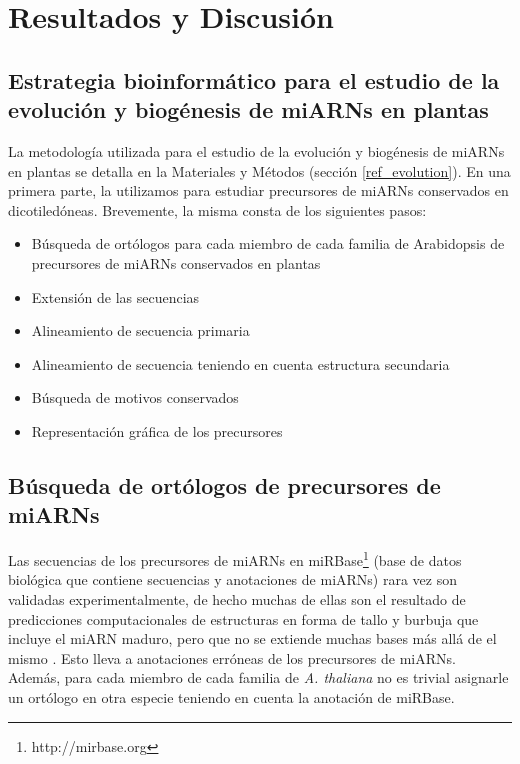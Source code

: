 \section{Resultados y Discusión}

\subsection{Estrategia bioinformático para el estudio de la evolución y biogénesis de miARNs en plantas}

La metodología utilizada para el estudio de la evolución y biogénesis de miARNs en plantas se detalla en la Materiales y Métodos (sección \ref{ref_evolution}).
En una primera parte, la utilizamos para estudiar precursores de miARNs conservados en dicotiledóneas. 
Brevemente, la misma consta de los siguientes pasos:

\begin{itemize}
    \item Búsqueda de ortólogos para cada miembro de cada familia de Arabidopsis de  precursores de miARNs conservados en plantas
    \item Extensión de las secuencias
    \item Alineamiento de secuencia primaria
    \item Alineamiento de secuencia teniendo en cuenta estructura secundaria
    \item Búsqueda de motivos conservados
    \item Representación gráfica de los precursores
\end{itemize}

\subsection{Búsqueda de ortólogos de precursores de miARNs}

Las secuencias de los precursores de miARNs en miRBase\footnote{http://mirbase.org} (base de datos biológica que contiene secuencias y anotaciones de miARNs) rara vez son validadas experimentalmente, de hecho muchas de ellas son el resultado de predicciones computacionales de estructuras en forma de tallo y burbuja que incluye el miARN maduro, pero que no se extiende muchas bases más allá de el mismo \cite{Kozomara2014}.
Esto lleva a anotaciones erróneas de los precursores de miARNs.
Además, para cada miembro de cada familia de \textit{A. thaliana} no es trivial asignarle un ortólogo en otra especie teniendo en cuenta la anotación de miRBase.

